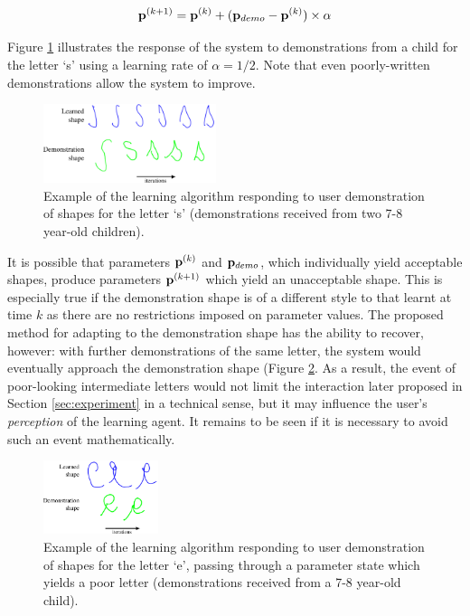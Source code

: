 \documentclass{sig-alternate}
\begin{document}
\begin{equation}\label{eq:update}
{\bf p}^{(k+1)} = {\bf p}^{(k)} + ({\bf p}_{demo}-{\bf
p}^{(k)})\times\alpha
\end{equation}

Figure \ref{fig:demonstrationShapes2} illustrates the response of the system to
demonstrations from a child for the letter `s' using a learning rate of
$\alpha=1/2$.  Note that even poorly-written demonstrations allow the system to improve.

\begin{figure}[thpb]
    \centering
    \includegraphics[width=0.45\textwidth]{figures/learningSdemo}
    \caption{\label{fig:demonstrationShapes2}Example of the learning algorithm
    responding to user demonstration of shapes for the letter `s' (demonstrations received from two 7-8 year-old children).}%
%
%
\end{figure}

It is possible that parameters ${\bf p}^{(k)}$ and ${\bf p}_{demo}$, which
individually yield acceptable shapes, produce parameters ${\bf p}^{(k+1)}$
which yield an unacceptable shape. This is especially true if the demonstration
shape is of a different style to that learnt at time $k$ as there are no
restrictions imposed on parameter values. The proposed method for adapting to
the demonstration shape has the ability to recover, however: with further
demonstrations of the same letter, the system would eventually approach the
demonstration shape (Figure \ref{fig:eDemo}. As a result, the event of poor-looking 
intermediate letters
would not limit the interaction later proposed in Section \ref{sec:experiment}
in a technical sense, but it may influence the user's \emph{perception} of the learning
agent. It remains to be seen if it is necessary to avoid such an event
mathematically.

\begin{figure}[thpb]
    \centering
    \includegraphics[width=0.3\textwidth]{figures/learningEdemo}
    \caption{\label{fig:eDemo}Example of the learning algorithm
    responding to user demonstration of shapes for the letter `e', passing through a parameter state which yields a poor letter (demonstrations received from a 7-8 year-old child).}
\end{figure}
\end{document}
